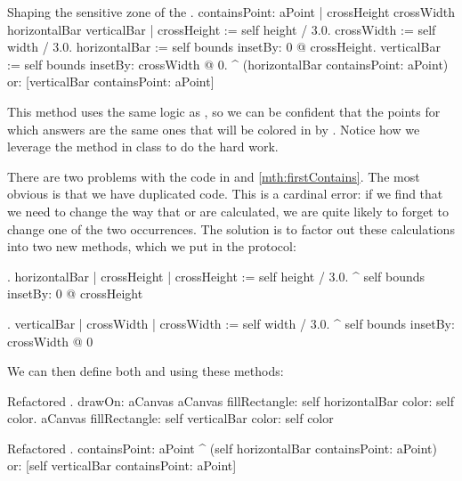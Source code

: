 \documentclass[a4paper,10pt,twoside]{book}
\begin{document}

\begin{method}[firstContains]{Shaping the sensitive zone of the .}
containsPoint: aPoint
	| crossHeight crossWidth horizontalBar verticalBar |
	crossHeight := self height / 3.0.
	crossWidth := self width / 3.0.
	horizontalBar := self bounds insetBy: 0 @ crossHeight.
	verticalBar := self bounds insetBy: crossWidth @ 0.
	^ (horizontalBar containsPoint: aPoint)
		or: [verticalBar containsPoint: aPoint]
\end{method}

This method uses the same logic as , so we can be confident that the points for which  answers  are the same ones that will be colored in by .
Notice how we leverage the  method in class  to do the hard work.

There are two problems with the code in  and \ref{mth:firstContains}.
The most obvious is that we have duplicated code.
This is a cardinal error: if we find that we need to change the way that  or  are calculated, we are quite likely to forget to change one of the two occurrences.
The solution is to factor out these calculations into two new methods, which we put in the  protocol:

\begin{method}{.}
horizontalBar
	| crossHeight |
	crossHeight := self height / 3.0.
	^ self bounds insetBy: 0 @ crossHeight
\end{method}

\begin{method}{.}
verticalBar
	| crossWidth |
	crossWidth := self width / 3.0.
	^ self bounds insetBy: crossWidth @ 0
\end{method}

\noindent
We can then define both  and  using these methods:

\begin{method}{Refactored .}
drawOn: aCanvas 
	aCanvas fillRectangle: self horizontalBar color: self color.
	aCanvas fillRectangle: self verticalBar color: self color
\end{method}

\begin{method}{Refactored .}
containsPoint: aPoint 
	^ (self horizontalBar containsPoint: aPoint)
		or: [self verticalBar containsPoint: aPoint]
\end{method}
\end{document}
